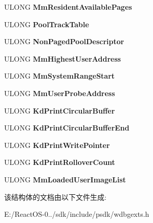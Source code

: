 \begin{DoxyCompactItemize}
U\+L\+O\+NG {\bfseries Mm\+Resident\+Available\+Pages}
\item 
\mbox{\label{struct___k_d_d_e_b_u_g_g_e_r___d_a_t_a32_ae0ee13452ca64653aa04a0004a161a03}} 
U\+L\+O\+NG {\bfseries Pool\+Track\+Table}
\item 
\mbox{\label{struct___k_d_d_e_b_u_g_g_e_r___d_a_t_a32_abb31b1afab1660e076bf92f8adc12545}} 
U\+L\+O\+NG {\bfseries Non\+Paged\+Pool\+Descriptor}
\item 
\mbox{\label{struct___k_d_d_e_b_u_g_g_e_r___d_a_t_a32_a4ba1395e5027238fa8954a2d09b71100}} 
U\+L\+O\+NG {\bfseries Mm\+Highest\+User\+Address}
\item 
\mbox{\label{struct___k_d_d_e_b_u_g_g_e_r___d_a_t_a32_aa32eab4e1fcf1b50104565ad52fbc990}} 
U\+L\+O\+NG {\bfseries Mm\+System\+Range\+Start}
\item 
\mbox{\label{struct___k_d_d_e_b_u_g_g_e_r___d_a_t_a32_aafeec10fb41b6e4d2c3469a7487cc23a}} 
U\+L\+O\+NG {\bfseries Mm\+User\+Probe\+Address}
\item 
\mbox{\label{struct___k_d_d_e_b_u_g_g_e_r___d_a_t_a32_aa7b0337802c96fb88a5ce3bf0a3f5bc9}} 
U\+L\+O\+NG {\bfseries Kd\+Print\+Circular\+Buffer}
\item 
\mbox{\label{struct___k_d_d_e_b_u_g_g_e_r___d_a_t_a32_a601a4ae5768d10d3dafe4d0a26b76fb4}} 
U\+L\+O\+NG {\bfseries Kd\+Print\+Circular\+Buffer\+End}
\item 
\mbox{\label{struct___k_d_d_e_b_u_g_g_e_r___d_a_t_a32_a6fcf62f6a72daa57848b82ddeac2e3e9}} 
U\+L\+O\+NG {\bfseries Kd\+Print\+Write\+Pointer}
\item 
\mbox{\label{struct___k_d_d_e_b_u_g_g_e_r___d_a_t_a32_a60d0bc6459ee09cd7b22743d9a604463}} 
U\+L\+O\+NG {\bfseries Kd\+Print\+Rollover\+Count}
\item 
\mbox{\label{struct___k_d_d_e_b_u_g_g_e_r___d_a_t_a32_ab574072e3eea6cc1b9fa7797c20fec82}} 
U\+L\+O\+NG {\bfseries Mm\+Loaded\+User\+Image\+List}
\end{DoxyCompactItemize}


该结构体的文档由以下文件生成\+:\begin{DoxyCompactItemize}
\item 
E\+:/\+React\+O\+S-\/0../sdk/include/psdk/wdbgexts.\+h\end{DoxyCompactItemize}
